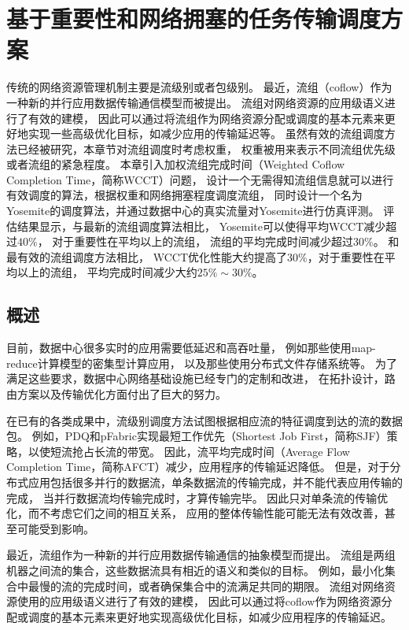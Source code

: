 \chapter{基于重要性和网络拥塞的任务传输调度方案}
\label{cha:Yosemite}
传统的网络资源管理机制主要是流级别或者包级别。
最近，流组（coflow）作为一种新的并行应用数据传输通信模型而被提出。
流组对网络资源的应用级语义进行了有效的建模，
因此可以通过将流组作为网络资源分配或调度的基本元素来更好地实现一些高级优化目标，如减少应用的传输延迟等。
虽然有效的流组调度方法已经被研究，本章节对流组调度时考虑权重，
权重被用来表示不同流组优先级或者流组的紧急程度。
本章引入加权流组完成时间（Weighted Coflow Completion Time，简称WCCT）问题，
设计一个无需得知流组信息就可以进行有效调度的算法，根据权重和网络拥塞程度调度流组，
同时设计一个名为Yosemite的调度算法，并通过数据中心的真实流量对Yosemite进行仿真评测。
评估结果显示，与最新的流组调度算法相比，
Yosemite可以使得平均WCCT减少超过$40\%$，
对于重要性在平均以上的流组，
流组的平均完成时间减少超过$30\%$。
和最有效的流组调度方法相比，
WCCT优化性能大约提高了$30\%$，对于重要性在平均以上的流组，
平均完成时间减少大约$25\%\sim30\%$。

\section{概述}
目前，数据中心很多实时的应用需要低延迟\cite{Latency,mastrolilli2010minimizing}和高吞吐量\cite{CloudMirror}，
例如那些使用map-reduce计算模型的密集型计算应用\cite{dean2008mapreduce}，
以及那些使用分布式文件存储\cite{lin2012secure,dimakis606049decentralized}系统等。
为了满足这些要求，数据中心网络基础设施已经专门的定制和改进，
在拓扑设计，路由方案以及传输优化方面付出了巨大的努力。

在已有的各类成果中，流级别调度方法试图根据相应流的特征调度到达的流的数据包。
例如，PDQ\cite{PDQ}和pFabric\cite{pFabric}实现最短工作优先（Shortest Job First，简称SJF）策略，以使短流抢占长流的带宽。
因此，流平均完成时间（Average Flow Completion Time，简称AFCT）减少，应用程序的传输延迟降低。
但是，对于分布式应用包括很多并行的数据流，单条数据流的传输完成，并不能代表应用传输的完成，
当并行数据流均传输完成时，才算传输完毕。
因此只对单条流的传输优化，而不考虑它们之间的相互关系，
应用的整体传输性能可能无法有效改善，甚至可能受到影响。


最近，流组作为一种新的并行应用数据传输通信的抽象模型而提出。
流组是两组机器之间流的集合，这些数据流具有相近的语义和类似的目标\cite{chowdhury2012coflow}。
例如，最小化集合中最慢的流的完成时间，或者确保集合中的流满足共同的期限。
流组对网络资源使用的应用级语义进行了有效的建模，
因此可以通过将coflow作为网络资源分配或调度的基本元素来更好地实现高级优化目标，如减少应用程序的传输延迟。
 
